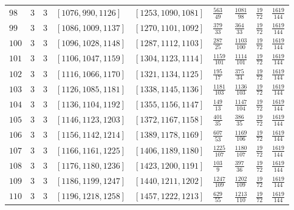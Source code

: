 \documentclass[12pt]{extarticle}
\begin{document}
\begin{longtable}{lllllllll}
$98$ & $3$ & $3$ & $\left[1076, 990, 1126\right]$ & $\left[1253, 1090, 1081\right]$ & $\frac{563}{49}$ & $\frac{1081}{98}$ & $\frac{19}{72}$ & $\frac{1619}{144}$ \\
$99$ & $3$ & $3$ & $\left[1086, 1009, 1137\right]$ & $\left[1270, 1101, 1092\right]$ & $\frac{379}{33}$ & $\frac{364}{33}$ & $\frac{19}{72}$ & $\frac{1619}{144}$ \\
$100$ & $3$ & $3$ & $\left[1096, 1028, 1148\right]$ & $\left[1287, 1112, 1103\right]$ & $\frac{287}{25}$ & $\frac{1103}{100}$ & $\frac{19}{72}$ & $\frac{1619}{144}$ \\
$101$ & $3$ & $3$ & $\left[1106, 1047, 1159\right]$ & $\left[1304, 1123, 1114\right]$ & $\frac{1159}{101}$ & $\frac{1114}{101}$ & $\frac{19}{72}$ & $\frac{1619}{144}$ \\
$102$ & $3$ & $3$ & $\left[1116, 1066, 1170\right]$ & $\left[1321, 1134, 1125\right]$ & $\frac{195}{17}$ & $\frac{375}{34}$ & $\frac{19}{72}$ & $\frac{1619}{144}$ \\
$103$ & $3$ & $3$ & $\left[1126, 1085, 1181\right]$ & $\left[1338, 1145, 1136\right]$ & $\frac{1181}{103}$ & $\frac{1136}{103}$ & $\frac{19}{72}$ & $\frac{1619}{144}$ \\
$104$ & $3$ & $3$ & $\left[1136, 1104, 1192\right]$ & $\left[1355, 1156, 1147\right]$ & $\frac{149}{13}$ & $\frac{1147}{104}$ & $\frac{19}{72}$ & $\frac{1619}{144}$ \\
$105$ & $3$ & $3$ & $\left[1146, 1123, 1203\right]$ & $\left[1372, 1167, 1158\right]$ & $\frac{401}{35}$ & $\frac{386}{35}$ & $\frac{19}{72}$ & $\frac{1619}{144}$ \\
$106$ & $3$ & $3$ & $\left[1156, 1142, 1214\right]$ & $\left[1389, 1178, 1169\right]$ & $\frac{607}{53}$ & $\frac{1169}{106}$ & $\frac{19}{72}$ & $\frac{1619}{144}$ \\
$107$ & $3$ & $3$ & $\left[1166, 1161, 1225\right]$ & $\left[1406, 1189, 1180\right]$ & $\frac{1225}{107}$ & $\frac{1180}{107}$ & $\frac{19}{72}$ & $\frac{1619}{144}$ \\
$108$ & $3$ & $3$ & $\left[1176, 1180, 1236\right]$ & $\left[1423, 1200, 1191\right]$ & $\frac{103}{9}$ & $\frac{397}{36}$ & $\frac{19}{72}$ & $\frac{1619}{144}$ \\
$109$ & $3$ & $3$ & $\left[1186, 1199, 1247\right]$ & $\left[1440, 1211, 1202\right]$ & $\frac{1247}{109}$ & $\frac{1202}{109}$ & $\frac{19}{72}$ & $\frac{1619}{144}$ \\
$110$ & $3$ & $3$ & $\left[1196, 1218, 1258\right]$ & $\left[1457, 1222, 1213\right]$ & $\frac{629}{55}$ & $\frac{1213}{110}$ & $\frac{19}{72}$ & $\frac{1619}{144}$ \\

\end{longtable}
\end{document}
